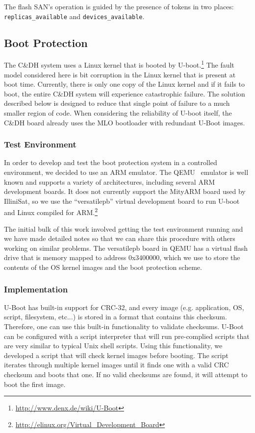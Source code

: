 The flash SAN's operation is guided by the presence of tokens in two places: \texttt{replicas\_available} and \texttt{devices\_available}.

\subsection{Boot Protection}

The C\&DH system uses a Linux kernel that is booted by
U-boot.\footnote{\url{http://www.denx.de/wiki/U-Boot}} The fault model
considered here is bit corruption in the Linux kernel that is present at boot
time.  Currently, there is only one copy of the Linux kernel and if it fails to
boot, the entire C\&DH system will experience catastrophic failure.  The
solution described below is designed to reduce that single point of failure to a
much smaller region of code.  When considering the reliability of U-boot itself,
the C\&DH board already uses the MLO bootloader with redundant U-Boot images.

\subsubsection{Test Environment}
In order to develop and test the boot protection system in a controlled
environment, we decided to use an ARM emulator.  The QEMU~\cite{bellard2005qemu}
emulator is well known and supports a variety of architectures, including
several ARM development boards.  It does not currently support the MityARM board
used by IlliniSat, so we use the ``versatilepb'' virtual development board to
run U-boot and Linux compiled for
ARM.\footnote{\url{http://elinux.org/Virtual_Development_Board}}

The initial bulk of this work involved getting the test environment running and
we have made detailed notes so that we can share this procedure with others
working on similar problems.  The versatilepb board in QEMU has a virtual flash
drive that is memory mapped to address 0x3400000, which we use to store the
contents of the OS kernel images and the boot protection scheme.

\subsubsection{Implementation}
U-Boot has built-in support for CRC-32, and every image (e.g. application, OS,
script, filesystem, etc...) is stored in a format that contains this checksum.
Therefore, one can use this built-in functionality to validate checksums.
U-Boot can be configured with a script interpreter that will run pre-complied
scripts that are very similar to typical Unix shell scripts. Using this
functionality, we developed a script that will check kernel images before
booting. The script iterates through multiple kernel images until it finds one
with a valid CRC checksum and boots that one.  If no valid checksums are found,
it will attempt to boot the first image.  

